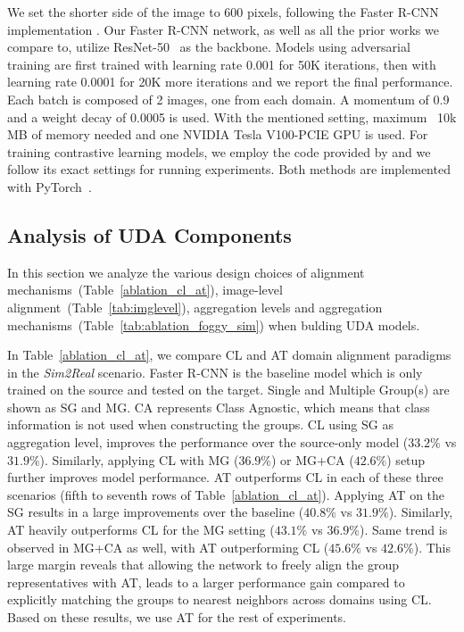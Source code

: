 \documentclass[10pt,twocolumn,letterpaper]{article}
\DeclareRobustCommand{\Tableref}[1]{Table~\ref{#1}}
\begin{document}
 We set the shorter side of the image to 600 pixels, following the Faster R-CNN implementation \cite{ren2015faster}. Our Faster R-CNN network, as well as all the prior works we compare to, utilize ResNet-50~\cite{he2016deep} as the backbone. Models using adversarial training are first trained with learning rate 0.001 for 50K iterations, then with learning rate 0.0001 for 20K more iterations and we report the final performance. Each batch is composed of 2 images, one from each domain. A momentum of 0.9 and a weight decay of 0.0005 is used. With the mentioned setting, maximum ~10k MB of memory needed and one NVIDIA Tesla V100-PCIE GPU is used. For training contrastive learning models, we employ the code provided by \cite{GPA} and we follow its exact settings for running experiments. Both methods are implemented with PyTorch~\cite{pytorch}.   


\subsection{Analysis of UDA Components}
\label{subsec:res_experimental_analysis}
In this section we analyze the various design choices of alignment mechanisms~(\Tableref{ablation_cl_at}), image-level alignment~(\Tableref{tab:imglevel}), aggregation levels and aggregation mechanisms~(\Tableref{tab:ablation_foggy_sim}) when  bulding UDA models.


In Table~\ref{ablation_cl_at}, we compare CL and AT domain alignment paradigms in the \emph{Sim2Real} scenario.
Faster R-CNN is the baseline model which is only trained on the source and tested on the target. Single and Multiple Group(s) are shown as SG and MG. CA represents Class Agnostic, which means that class information is not used when constructing the groups. 
CL using SG as aggregation level, improves the performance over the source-only model ($33.2\%$ vs $31.9\%$).
Similarly, applying CL with MG ($36.9\%$) or MG+CA ($42.6\%$) setup further improves  model performance.
AT  outperforms CL in each of these three scenarios (fifth to seventh rows of \Tableref{ablation_cl_at}).
Applying AT on the SG results in a large improvements over the baseline ($40.8\%$ vs $31.9\%$).
Similarly, AT heavily outperforms CL for the MG setting ($43.1\%$ vs $36.9\%$). 
Same trend is observed in MG+CA as well, with AT outperforming CL ($45.6\%$ vs $42.6\%$). 
This large margin reveals that allowing the network to freely align the group representatives with AT, leads to a larger performance gain compared to explicitly matching the groups to nearest neighbors across domains using CL. 
Based on these results, we use AT for the rest of experiments.
\end{document}
